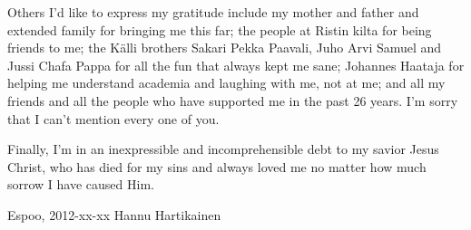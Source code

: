 \documentclass[12pt,a4paper,oneside]{report}
\newcommand{\DATE}{2012-xx-xx}
\newcommand{\AUTHOR}{Hannu Hartikainen}
\begin{document}
Others I'd like to express my gratitude include my mother and father and extended family for bringing me this far; the people at Ristin kilta for being friends to me; the Källi brothers Sakari Pekka Paavali, Juho Arvi Samuel and Jussi Chafa Pappa for all the fun that always kept me sane; Johannes Haataja for helping me understand academia and laughing with me, not at me; and all my friends and all the people who have supported me in the past 26 years. I'm sorry that I can't mention every one of you.

Finally, I'm in an inexpressible and incomprehensible debt to my savior Jesus Christ, who has died for my sins and always loved me no matter how much sorrow I have caused Him.

\vskip 10mm

\noindent Espoo, \DATE
\vskip 5mm
\noindent\AUTHOR




\cleardoublepage
\tableofcontents

\label{pages-prelude}
\cleardoublepage


\startfirstchapter

\pagestyle{headings}





% 

\end{document}
